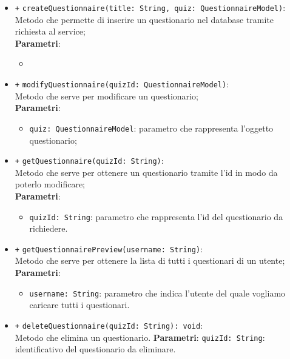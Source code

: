 \begin{itemize}
		\begin{itemize}
			\item \texttt{+} \texttt{createQuestionnaire(title: String, quiz: QuestionnaireModel)}: \\Metodo che permette di inserire un questionario nel database tramite richiesta al service; \\
			\textbf{Parametri}:
			\begin{itemize}
				\item 
			\end{itemize}
			\item \texttt{+} \texttt{modifyQuestionnaire(quizId: QuestionnaireModel)}: \\ Metodo che serve per modificare un questionario; \\
			\textbf{Parametri}:
			\begin{itemize}
				\item \texttt{quiz: QuestionnaireModel}: parametro che rappresenta l'oggetto questionario;
			\end{itemize}
			\item \texttt{+} \texttt{getQuestionnaire(quizId: String)}: \\Metodo che serve per ottenere un questionario tramite l'id in modo da poterlo modificare; \\
			\textbf{Parametri}:
			\begin{itemize}
				\item \texttt{quizId: String}: parametro che rappresenta l'id del questionario da richiedere.
			\end{itemize}
			\item \texttt{+} \texttt{getQuestionnairePreview(username: String)}: \\ Metodo che serve per ottenere la lista di tutti i questionari di un utente; \\
			\textbf{Parametri}:
			\begin{itemize}
				\item \texttt{username: String}: parametro che indica l'utente del quale vogliamo caricare tutti i questionari.
			\end{itemize}
			\item \texttt{+} \texttt{deleteQuestionnaire(quizId: String): void}: \\Metodo che elimina un questionario.
			\textbf{Parametri}:
			\texttt{quizId: String}: identificativo del questionario da eliminare.
		\end{itemize}
	\end{itemize}
	
